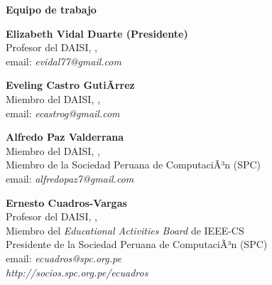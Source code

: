 \begin{center}
{\bf \Huge Equipo de trabajo}
\end{center}
\vspace{1cm}

\begin{center}
\textbf{Elizabeth Vidal Duarte (Presidente)}\\
Profesor del DAISI, \University, \city\\
email: \textit{evidal77@gmail.com}
\end{center}

\begin{center}
\textbf{Eveling Castro GutiÃrrez}\\
Miembro del DAISI, \University, \city\\
email: \textit{ecastrog@gmail.com}
\end{center}

\begin{center}
\textbf{Alfredo Paz Valderrana}\\
Miembro del DAISI, \University, \city\\
Miembro de la Sociedad Peruana de ComputaciÃ³n (SPC)\\
email: \textit{alfredopaz7@gmail.com}
\end{center}

\begin{center}
\textbf{Ernesto Cuadros-Vargas}\\
Profesor del DAISI, \University, \city\\
Miembro del \textit{Educational Activities Board} de IEEE-CS\\
Presidente de la Sociedad Peruana de ComputaciÃ³n (SPC)\\
email: \textit{ecuadros@spc.org.pe}\\
\textit{http://socios.spc.org.pe/ecuadros}
\end{center}




